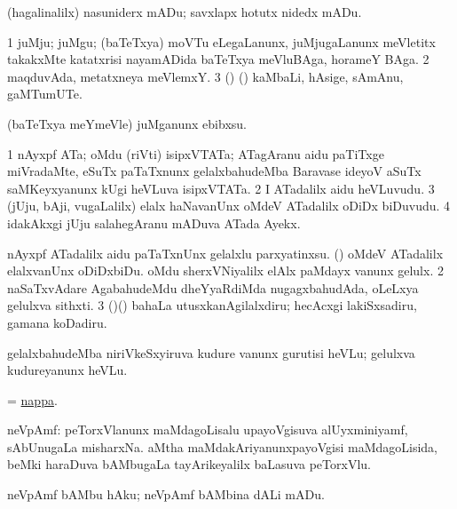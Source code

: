 \noindent
\gl{\pagu}
\bmng
 (hagalinalilx) nasuniderx mADu; savxlapx hotutx nidedx mADu. 
\emng
\eentry

\bentry
{}
\gl{\nA}
\bmng
\bnum
\num{1} juMju; juMgu; (baTeTxya) moVTu eLegaLanunx, juMjugaLanunx meVletitx takakxMte katatxrisi nayamADida baTeTxya meVluBAga, horameY BAga. 
\num{2} maqduvAda, metatxneya meVlemxY. 
\num{3} (\AseTxrXV) (\AmA) kaMbaLi, hAsige, sAmAnu, gaMTumUTe. 
\enum
\emng
\eentry

\bentry
{}
\gl{\sakirx}
\bmng
(baTeTxya meYmeVle) juMganunx ebibxsu. 
\emng
\eentry

\bentry
{}
\gl{\nA}
\bmng
\bnum
\num{1} nAyxpf ATa; oMdu (riVti) isipxVTATa; ATagAranu aidu paTiTxge miVradaMte, eSuTx paTaTxnunx gelalxbahudeMba Baravase ideyoV aSuTx saMKeyxyanunx kUgi heVLuva isipxVTATa. 
\num{2} I ATadalilx aidu heVLuvudu. 
\num{3} (jUju, bAji, \mo vugaLalilx) elalx haNavanUnx oMdeV ATadalilx oDiDx biDuvudu. 
\num{4} idakAkxgi jUju salahegAranu mADuva ATada Ayekx. 
\enum
\emng

\noindent
\gl{\pagu}
\bmng
\bnum
{}  
\banum
{} nAyxpf ATadalilx aidu paTaTxnUnx gelalxlu parxyatinxsu. 
 (\rUpa) oMdeV ATadalilx elalxvanUnx oDiDxbiDu. 
 oMdu sherxVNiyalilx elAlx paMdayx \mo vanunx gelulx. 
\eanum
\numie
\num{2}  naSaTxvAdare AgabahudeMdu dheYyaRdiMda nugagxbahudAda, oLeLxya gelulxva sithxti. 
\num{3} (\AseTxrXV)(\AmA) bahaLa utusxkanAgilalxdiru; hecAcxgi lakiSxsadiru, gamana koDadiru. 
\enum
\emng
\eentry

\bentry
{}
\gl{\sakirx}
\bmng
gelalxbahudeMba niriVkeSxyiruva kudure \mo vanunx gurutisi heVLu; gelulxva kudureyanunx heVLu. 
\emng
\eentry

\bentry
{}
\gl{\nA}
\bmng
= \hyperlink{nappa}{nappa}. 
\emng
\eentry

\bentry
{}
\gl{\nA}
\bmng
neVpAmf: 
\banum
{} peTorxVlanunx maMdagoLisalu upayoVgisuva alUyxminiyamf, sAbUnugaLa misharxNa. 
 aMtha maMdakAriyanunxpayoVgisi maMdagoLisida, beMki haraDuva bAMbugaLa tayArikeyalilx baLasuva peTorxVlu. 
\eanum
\emng
\eentry

\bentry
{}
\gl{\sakirx}
\bmng
neVpAmf bAMbu hAku; neVpAmf bAMbina dALi mADu. 
\emng
\eentry

